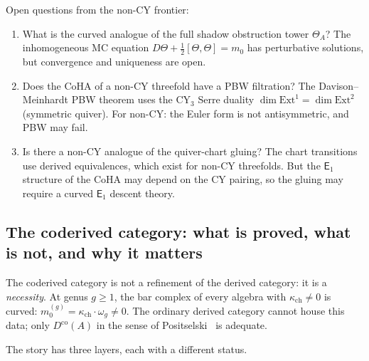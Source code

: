 \documentclass[11pt]{article}
\newcommand{\Eone}{\mathsf{E}_1}
\begin{document}
\noindent Open questions from the non-CY frontier:

\begin{enumerate}[label=\textbf{Q\arabic*.}, start=9]
\item What is the curved analogue of the full shadow obstruction tower $\Theta_A$?
 The inhomogeneous MC equation $D\Theta + \tfrac{1}{2}[\Theta,\Theta] = m_0$
 has perturbative solutions, but convergence and uniqueness are open.

\item Does the CoHA of a non-CY threefold have a PBW filtration?
 The Davison--Meinhardt PBW theorem uses the CY$_3$ Serre duality
 $\dim \mathrm{Ext}^1 = \dim \mathrm{Ext}^2$ (symmetric quiver).
 For non-CY: the Euler form is not antisymmetric, and PBW may fail.

\item Is there a non-CY analogue of the quiver-chart gluing?
 The chart transitions use derived equivalences, which exist for non-CY
 threefolds. But the $\Eone$ structure of the CoHA may depend on the
 CY pairing, so the gluing may require a curved $\Eone$ descent theory.
\end{enumerate}

\subsection{The coderived category: what is proved, what is not, and why it matters}
\label{subsec:coderived-status}

The coderived category is not a refinement of the derived category: it is a
\emph{necessity}. At genus $g \geq 1$, the bar complex of every algebra with
$\kappa_{\mathrm{ch}} \neq 0$ is curved: $m_0^{(g)} = \kappa_{\mathrm{ch}} \cdot \omega_g \neq 0$. The
ordinary derived category cannot house this data; only
$D^{\mathrm{co}}(A)$ in the sense of Positselski~\cite{Positselski11} is adequate.

The story has three layers, each with a different status.
\end{document}
